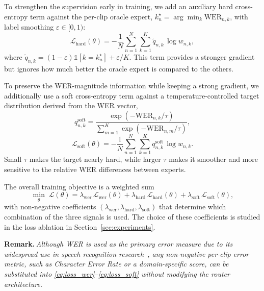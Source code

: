 \documentclass[journal]{IEEEtran}
\begin{document}
To strengthen the supervision early in training, we add an auxiliary hard cross-entropy term against the per-clip oracle expert, $k_n^\star=\arg\min_{k}\mathrm{WER}_{n,k}$, with label smoothing
$\varepsilon\in[0,1)$:
\begin{equation}
\mathcal{L}_{\text{hard}}(\theta) =
-\frac{1}{N}\sum_{n=1}^{N}\sum_{k=1}^{K}
\tilde{q}_{n,k}\,\log w_{n,k},
\label{eq:loss_hard}
\end{equation}
where $\tilde{q}_{n,k}=(1-\varepsilon)\mathbb{1}[k=k_n^\star]+\varepsilon/K$.
This term provides a stronger gradient but ignores how much better the
oracle expert is compared to the others.

To preserve the WER-magnitude information while keeping a strong
gradient, we additionally use a soft cross-entropy term
against a temperature-controlled target distribution derived from the
WER vector,
\begin{equation}
q_{n,k}^{\mathrm{soft}} =
\frac{\exp(-\mathrm{WER}_{n,k}/\tau)}
{\sum_{m=1}^{K}\exp(-\mathrm{WER}_{n,m}/\tau)},
\label{eq:soft_target}
\end{equation}
\begin{equation}
\mathcal{L}_{\text{soft}}(\theta) =
-\frac{1}{N}\sum_{n=1}^{N}\sum_{k=1}^{K}
q_{n,k}^{\mathrm{soft}}\,\log w_{n,k}.
\label{eq:loss_soft}
\end{equation}
Small $\tau$ makes the target nearly hard, while larger $\tau$ makes it smoother and more sensitive to the relative WER differences between experts.

The overall training objective is a weighted sum
\begin{equation}
\min_{\theta}\;
\mathcal{L}(\theta) =
\lambda_{\text{wer}}\,\mathcal{L}_{\text{wer}}(\theta)
+\lambda_{\text{hard}}\,\mathcal{L}_{\text{hard}}(\theta)
+\lambda_{\text{soft}}\,\mathcal{L}_{\text{soft}}(\theta),
\label{eq:total_objective}
\end{equation}
with non-negative coefficients
$(\lambda_{\text{wer}},\lambda_{\text{hard}},\lambda_{\text{soft}})$
that determine which combination of the three signals is used. The
choice of these coefficients is studied in the loss ablation in
Section~\ref{sec:experiments}.

\vspace{0.1cm}
\noindent\textbf{Remark.}\,\textit{Although WER is used as the
primary error measure due to its widespread use in speech recognition
research~\cite{yu2016asrdeep,li2014overviewrobust}, any non-negative
per-clip error metric, such as Character Error Rate or a
domain-specific score, can be substituted into
\eqref{eq:loss_wer}--\eqref{eq:loss_soft} without modifying the
router architecture.}
\vspace{0.1cm}
\end{document}

